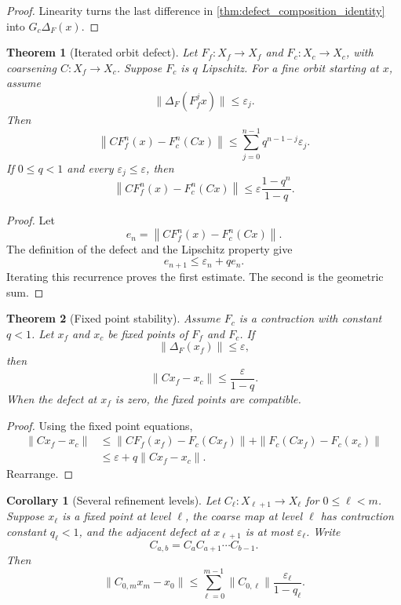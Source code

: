 \documentclass{aomart}
\newtheorem{theorem}{Theorem}[section]
\newtheorem{corollary}[corollary]{Corollary}
\theoremstyle{definition}
\theoremstyle{remark}
\begin{document}
\begin{proof}
Linearity turns the last difference in \cref{thm:defect_composition_identity} into $G_c\Delta_F(x)$.
\end{proof}

\begin{theorem}[Iterated orbit defect]\label{thm:iterated_orbit_defect}
Let $F_f:X_f\to X_f$ and $F_c:X_c\to X_c$, with coarsening $C:X_f\to X_c$.  Suppose $F_c$ is $q$ Lipschitz.  For a fine orbit starting at $x$, assume
\[
\|\Delta_F(F_f^j x)\|\le\varepsilon_j.
\]
Then
\[
\left\|CF_f^n(x)-F_c^n(Cx)\right\|
\le
\sum_{j=0}^{n-1}q^{n-1-j}\varepsilon_j.
\]
If $0\le q<1$ and every $\varepsilon_j\le\varepsilon$, then
\[
\left\|CF_f^n(x)-F_c^n(Cx)\right\|
\le
\varepsilon\frac{1-q^n}{1-q}.
\]
\end{theorem}

\begin{proof}
Let
\[
e_n=\left\|CF_f^n(x)-F_c^n(Cx)\right\|.
\]
The definition of the defect and the Lipschitz property give
\[
e_{n+1}\le\varepsilon_n+qe_n.
\]
Iterating this recurrence proves the first estimate.  The second is the geometric sum.
\end{proof}

\begin{theorem}[Fixed point stability]\label{thm:fixed_point_stability}
Assume $F_c$ is a contraction with constant $q<1$.  Let $x_f$ and $x_c$ be fixed points of $F_f$ and $F_c$.  If
\[
\|\Delta_F(x_f)\|\le\varepsilon,
\]
then
\[
\|Cx_f-x_c\|
\le
\frac{\varepsilon}{1-q}.
\]
When the defect at $x_f$ is zero, the fixed points are compatible.
\end{theorem}

\begin{proof}
Using the fixed point equations,
\[
\begin{aligned}
\|Cx_f-x_c\|
&\le
\|CF_f(x_f)-F_c(Cx_f)\|
+
\|F_c(Cx_f)-F_c(x_c)\|\\
&\le
\varepsilon+q\|Cx_f-x_c\|.
\end{aligned}
\]
Rearrange.
\end{proof}

\begin{corollary}[Several refinement levels]\label{cor:multilevel_fixed_points}
Let $C_\ell:X_{\ell+1}\to X_\ell$ for $0\le\ell<m$.  Suppose $x_\ell$ is a fixed point at level $\ell$, the coarse map at level $\ell$ has contraction constant $q_\ell<1$, and the adjacent defect at $x_{\ell+1}$ is at most $\varepsilon_\ell$.  Write
\[
C_{a,b}=C_aC_{a+1}\cdots C_{b-1}.
\]
Then
\[
\|C_{0,m}x_m-x_0\|
\le
\sum_{\ell=0}^{m-1}
\|C_{0,\ell}\|
\frac{\varepsilon_\ell}{1-q_\ell}.
\]
\end{corollary}
\end{document}

